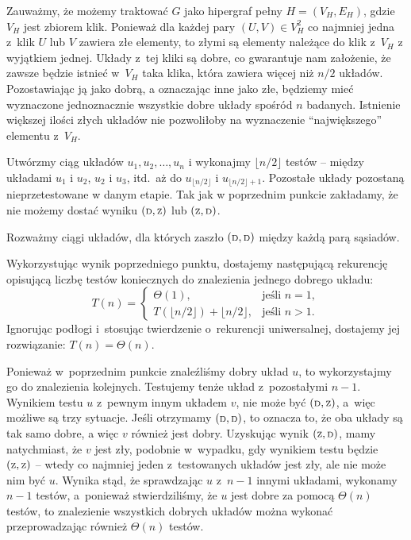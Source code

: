 Zauważmy, że możemy traktować $G$ jako hipergraf pełny $H=(V_H,E_H)$, gdzie $V_H$ jest zbiorem klik. Ponieważ dla każdej pary $(U,V)\in V_H^2$ co najmniej jedna z~klik $U$ lub $V$ zawiera złe elementy, to złymi są elementy należące do klik z~$V_H$ z wyjątkiem jednej. Układy z~tej kliki są dobre, co gwarantuje nam założenie, że zawsze będzie istnieć w~$V_H$ taka klika, która zawiera więcej niż $n/2$ układów. Pozostawiając ją jako dobrą, a oznaczając inne jako złe, będziemy mieć wyznaczone jednoznacznie wszystkie dobre układy spośród $n$ badanych. Istnienie większej ilości złych układów nie pozwoliłoby na wyznaczenie ``największego'' elementu z~$V_H$.

\subproblem %
Utwórzmy ciąg układów $u_1,u_2,\dots,u_n$ i wykonajmy $\lfloor n/2\rfloor$ testów -- między układami $u_1$ i $u_2$, $u_2$ i $u_3$, itd.\ aż do $u_{\lfloor n/2\rfloor}$ i $u_{\lfloor n/2\rfloor+1}$. Pozostałe układy pozostaną nieprzetestowane w danym etapie. Tak jak w poprzednim punkcie zakładamy, że nie możemy dostać wyniku $({\scriptstyle\rm D},{\scriptstyle\rm Z})$ lub $({\scriptstyle\rm Z},{\scriptstyle\rm D})$.

Rozważmy ciągi układów, dla których zaszło $({\scriptstyle\rm D},{\scriptstyle\rm D})$ między każdą parą sąsiadów. 

\subproblem %
Wykorzystując wynik poprzedniego punktu, dostajemy następującą rekurencję opisującą liczbę testów koniecznych do znalezienia jednego dobrego układu:
\[
	T(n) =
	\begin{cases}
		\Theta(1), & \text{jeśli $n=1$}, \\
		T(\lfloor n/2\rfloor) + \lfloor n/2\rfloor, & \text{jeśli $n>1$}.
	\end{cases}
\]
Ignorując podłogi i~stosując twierdzenie o~rekurencji uniwersalnej, dostajemy jej rozwiązanie: $T(n)=\Theta(n)$.

Ponieważ w~poprzednim punkcie znaleźliśmy dobry układ $u$, to wykorzystajmy go do znalezienia kolejnych. Testujemy tenże układ z~pozostałymi $n-1$. Wynikiem testu $u$ z~pewnym innym układem $v$, nie może być $({\scriptstyle\rm D},{\scriptstyle\rm Z})$, a~więc możliwe są trzy sytuacje. Jeśli otrzymamy $({\scriptstyle\rm D},{\scriptstyle\rm D})$, to oznacza to, że oba układy są tak samo dobre, a więc $v$ również jest dobry. Uzyskując wynik $({\scriptstyle\rm Z},{\scriptstyle\rm D})$, mamy natychmiast, że $v$ jest zły, podobnie w~wypadku, gdy wynikiem testu będzie $({\scriptstyle\rm Z},{\scriptstyle\rm Z})$ -- wtedy co najmniej jeden z~testowanych układów jest zły, ale nie może nim być $u$. Wynika stąd, że sprawdzając $u$ z~$n-1$ innymi układami, wykonamy $n-1$ testów, a~ponieważ stwierdziliśmy, że $u$ jest dobre za pomocą $\Theta(n)$ testów, to znalezienie wszystkich dobrych układów można wykonać przeprowadzając również $\Theta(n)$ testów.

